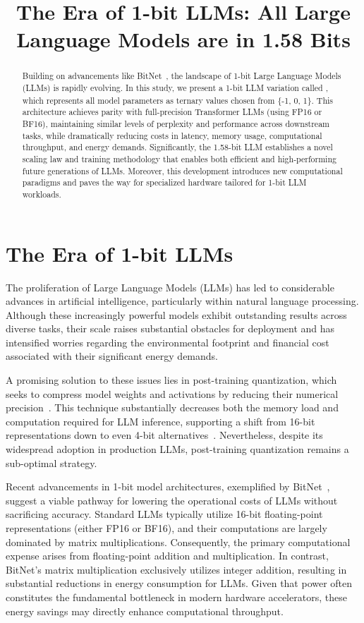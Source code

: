\title{The Era of 1-bit LLMs: All Large Language Models are in 1.58 Bits}

\begin{abstract}
Building on advancements like BitNet~\cite{bitnet}, the landscape of 1-bit Large Language Models (LLMs) is rapidly evolving. In this study, we present a 1-bit LLM variation called \textbf{}, which represents all model parameters as ternary values chosen from \{-1, 0, 1\}. This architecture achieves parity with full-precision Transformer LLMs (using FP16 or BF16), maintaining similar levels of perplexity and performance across downstream tasks, while dramatically reducing costs in latency, memory usage, computational throughput, and energy demands. Significantly, the 1.58-bit LLM establishes a novel scaling law and training methodology that enables both efficient and high-performing future generations of LLMs. Moreover, this development introduces new computational paradigms and paves the way for specialized hardware tailored for 1-bit LLM workloads.
\end{abstract}

\section{The Era of 1-bit LLMs}

The proliferation of Large Language Models (LLMs) has led to considerable advances in artificial intelligence, particularly within natural language processing. Although these increasingly powerful models exhibit outstanding results across diverse tasks, their scale raises substantial obstacles for deployment and has intensified worries regarding the environmental footprint and financial cost associated with their significant energy demands.

A promising solution to these issues lies in post-training quantization, which seeks to compress model weights and activations by reducing their numerical precision~\cite{smoothquant, gptq, quip, quip_sharp}. This technique substantially decreases both the memory load and computation required for LLM inference, supporting a shift from 16-bit representations down to even 4-bit alternatives~\cite{gptq, awq}. Nevertheless, despite its widespread adoption in production LLMs, post-training quantization remains a sub-optimal strategy.

Recent advancements in 1-bit model architectures, exemplified by BitNet~\cite{bitnet}, suggest a viable pathway for lowering the operational costs of LLMs without sacrificing accuracy. Standard LLMs typically utilize 16-bit floating-point representations (either FP16 or BF16), and their computations are largely dominated by matrix multiplications. Consequently, the primary computational expense arises from floating-point addition and multiplication. In contrast, BitNet's matrix multiplication exclusively utilizes integer addition, resulting in substantial reductions in energy consumption for LLMs. Given that power often constitutes the fundamental bottleneck in modern hardware accelerators, these energy savings may directly enhance computational throughput.

